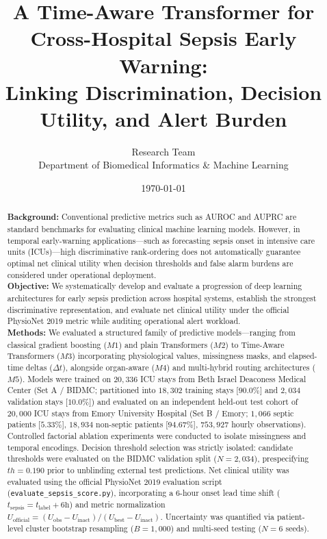 \documentclass[11pt,a4paper]{article}
\title{\textbf{A Time-Aware Transformer for Cross-Hospital Sepsis Early Warning:\\Linking Discrimination, Decision Utility, and Alert Burden}}
\author{
  Research Team\\
  \small Department of Biomedical Informatics \& Machine Learning\\
}
\date{\today}
\begin{document}
\maketitle

\begin{abstract}
\textbf{Background:} Conventional predictive metrics such as AUROC and AUPRC are standard benchmarks for evaluating clinical machine learning models. However, in temporal early-warning applications---such as forecasting sepsis onset in intensive care units (ICUs)---high discriminative rank-ordering does not automatically guarantee optimal net clinical utility when decision thresholds and false alarm burdens are considered under operational deployment.\\[0.5em]
\textbf{Objective:} We systematically develop and evaluate a progression of deep learning architectures for early sepsis prediction across hospital systems, establish the strongest discriminative representation, and evaluate net clinical utility under the official PhysioNet 2019 metric while auditing operational alert workload.\\[0.5em]
\textbf{Methods:} We evaluated a structured family of predictive models---ranging from classical gradient boosting ($M1$) and plain Transformers ($M2$) to Time-Aware Transformers ($M3$) incorporating physiological values, missingness masks, and elapsed-time deltas ($\Delta t$), alongside organ-aware ($M4$) and multi-hybrid routing architectures ($M5$). Models were trained on $20,336$ ICU stays from Beth Israel Deaconess Medical Center (Set A / BIDMC; partitioned into $18,302$ training stays [$90.0\%$] and $2,034$ validation stays [$10.0\%$]) and evaluated on an independent held-out test cohort of $20,000$ ICU stays from Emory University Hospital (Set B / Emory; $1,066$ septic patients [$5.33\%$], $18,934$ non-septic patients [$94.67\%$], $753,927$ hourly observations). Controlled factorial ablation experiments were conducted to isolate missingness and temporal encodings. Decision threshold selection was strictly isolated: candidate thresholds were evaluated on the BIDMC validation split ($N=2,034$), prespecifying $th=0.190$ prior to unblinding external test predictions. Net clinical utility was evaluated using the official PhysioNet 2019 evaluation script (\texttt{evaluate\_sepsis\_score.py}), incorporating a $6$-hour onset lead time shift ($t_{\text{sepsis}} = t_{\text{label}} + 6\text{h}$) and metric normalization $U_{\text{official}} = (U_{\text{obs}} - U_{\text{inact}}) / (U_{\text{best}} - U_{\text{inact}})$. Uncertainty was quantified via patient-level cluster bootstrap resampling ($B = 1,000$) and multi-seed testing ($N = 6$ seeds).\\[0.5em]

\end{abstract}
\end{document}
